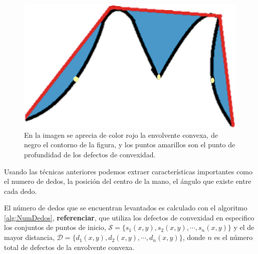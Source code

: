 \begin{figure}[h!]
\begin{center}
\includegraphics[scale=.4]{./Figures/ConvexHullAndDefects.png}
\end{center}
\caption{En la imagen se aprecia de color rojo la envolvente convexa, de negro el contorno de la figura, y los puntos amarillos son el punto de profundidad de los defectos de convexidad.}
\label{fig:FigConvexHullDefects}
\end{figure}  

Usando las técnicas anteriores podemos extraer características importantes como el numero de dedos, la posición del centro de la mano, el ángulo que existe entre cada dedo. 

El número de dedos que se encuentran levantados es calculado con el algoritmo \ref{alg:NumDedos}, \textbf{referenciar}, que utiliza los defectos de convexidad en especifico los conjuntos de puntos de inicio, $\mathcal{S}=\lbrace s_1(x,y), s_2(x,y), \cdots, s_n(x,y) \rbrace$ y el de mayor distancia, $\mathcal{D}=\lbrace d_1(x,y), d_2(x,y), \cdots, d_n(x,y) \rbrace$, donde $n$ es el número total de defectos de la envolvente convexa.  

\begin{algorithm}[h!]
\begin{algorithmic}[1]
\REQUIRE Los conjuntos $\mathcal{S}$, $\mathcal{D}$.   
\ENSURE Número de dedos, $Nf$.  

	\STATE $minDist=20$, $maxAng=60$, $antecesor=0$, $sucesor=0$. 	
	
	\STATE \textbf{continuar} 
	\ENDIF 
	
	\STATE $antecesor=n-1$
	\ELSE
	\STATE $antecesor=i-1$
	\ENDIF 

	\STATE $sucesor=0$
	\ELSE
	\STATE $sucesor=i+1$
	\ENDIF   
	
	\STATE Calcular el ángulo entre $s_{antecesor}(x,y)$, $d_i}$  $s_{sucesor}(x,y)$
	
	\IF{$ \text{ángulo} \geqslant maxAng$}
	\STATE \textbf{continuar}
	\ENDIF  
	
	\STATE $Nf=Nf+1$.
\ENDFOR 

\caption{Calcula el número de dedos de la mano.}
\label{alg:NumDedos} 
\end{algorithmic}
\end{algorithm} 

